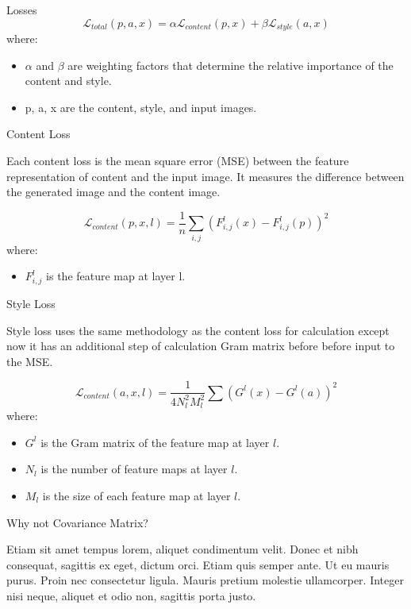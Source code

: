 \documentclass[final]{beamer}
\newlength{\colwidth}
\begin{document}
\begin{frame}[t]
\begin{columns}[t]
\begin{column}{\colwidth}
\begin{alertblock}{Losses}
    $$
    \mathcal{L}_{total}(p, a, x) = \alpha\mathcal{L}_{content}(p, x) + \beta\mathcal{L}_{style}(a, x)
    $$
    where:
    \begin{itemize}
        \item $\alpha$ and $\beta$ are weighting factors that determine the relative importance of the content and style.
        \item p, a, x are the content, style, and input images.
    \end{itemize}

  \end{alertblock}

  \begin{block}{Content Loss}

    Each content loss is the mean square error (MSE) between the feature representation of content and the input image. It measures the difference between the generated image and the content image.

    $$\mathcal{L}_{content}(p, x, l) = \frac{1}{n} \sum_{i, j}(F^l_{i, j}(x) - F^l_{i, j}(p))^2$$
    where:
    \begin{itemize}
        \item $F^l_{i, j}$ is the feature map at layer l.
    \end{itemize}

  \end{block}

  \begin{block}{Style Loss}

    Style loss uses the same methodology as the content loss for calculation except now it has an additional step of calculation Gram matrix before before input to the MSE.
    
    $$\mathcal{L}_{content}(a, x, l) = \frac{1}{4 N^2_l M^2_l} \sum (G^l(x) - G^l(a))^2 $$
    where:
    \begin{itemize}
        \item $G^l$ is the Gram matrix of the feature map at layer $l$.
        \item $N_l$ is the number of feature maps at layer $l$.
        \item $M_l$ is the size of each feature map at layer $l$.
    \end{itemize}

  \end{block}


  \begin{block}{Why not Covariance Matrix?}

    Etiam sit amet tempus lorem, aliquet condimentum velit. Donec et nibh
    consequat, sagittis ex eget, dictum orci. Etiam quis semper ante. Ut eu
    mauris purus. Proin nec consectetur ligula. Mauris pretium molestie
    ullamcorper. Integer nisi neque, aliquet et odio non, sagittis porta justo.


\end{block}
\end{column}
\end{columns}
\end{frame}
\end{document}
